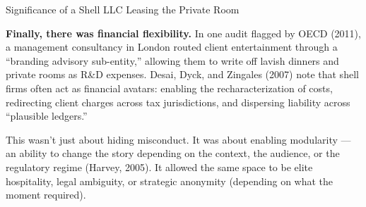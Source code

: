 \begin{TechnicalSidebar}{Significance of a Shell LLC Leasing the Private Room}
  \medskip

  \textbf{Finally, there was financial flexibility.}  
  In one audit flagged by OECD (2011), a management consultancy in London routed client entertainment 
  through a “branding advisory sub-entity,” allowing them to write off lavish dinners and private rooms 
  as R\&D expenses. Desai, Dyck, and Zingales (2007) note that shell firms often act as financial avatars: 
  enabling the recharacterization of costs, redirecting client charges across tax jurisdictions, and 
  dispersing liability across “plausible ledgers.”

  \medskip

  This wasn’t just about hiding misconduct.  
  It was about enabling modularity — an ability to change the story depending on the context, 
  the audience, or the regulatory regime (Harvey, 2005).  
  It allowed the same space to be elite hospitality, legal ambiguity, or strategic anonymity 
  (depending on what the moment required).

\end{TechnicalSidebar}

  
